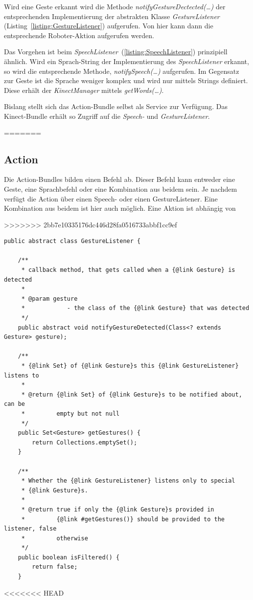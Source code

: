 Wird eine Geste erkannt wird die Methode \textit{notifyGestureDectected(\ldots)} der entsprechenden Implementierung der abstrakten Klasse
\textit{GestureListener} (Listing~\ref{listing:GestureListener}) aufgerufen. Von hier kann dann die entsprechende Roboter-Aktion aufgerufen werden.

Das Vorgehen ist beim \textit{SpeechListener}~(\ref{listing:SpeechListener}) prinzipiell \"ahnlich. Wird ein Sprach-String der Implementierung
des \textit{SpeechListener} erkannt, so wird die entsprechende Methode, \textit{notifySpeech(\ldots)} aufgerufen. Im Gegensatz zur Geste ist die
Sprache weniger komplex und wird nur mittels Strings definiert. Diese erh\"alt der \textit{KinectManager} mittels \textit{getWords(\ldots)}.

Bislang stellt sich das Action-Bundle selbst als Service zur Verf\"ugung. Das Kinect-Bundle erh\"alt so Zugriff auf die \textit{Speech-} und 
\textit{GestureListener}.


\par\smallskip
\lstset{language=Java}
=======

\subsection{Action}

Die Action-Bundles bilden einen Befehl ab. Dieser Befehl kann entweder eine Geste, eine Sprachbefehl oder eine Kombination aus beidem sein. Je nachdem verf\"ugt die Action \"uber einen Speech- oder einen GestureListener. Eine Kombination aus beidem ist hier auch m\"oglich. Eine Aktion ist abh\"angig von

\lstset{language=Java,
 basicstyle=\footnotesize, 
 numbers=left,
 captionpos=b,
 showspaces=false,             
 showstringspaces=false,}
>>>>>>> 2bb7e10335176dc446d28fa0516733abbf1cc9ef
\begin{lstlisting}[caption={Klasse GestureListener}, label={listing:GestureListener}]
public abstract class GestureListener {

	/**
	 * callback method, that gets called when a {@link Gesture} is detected
	 * 
	 * @param gesture
	 *            - the class of the {@link Gesture} that was detected
	 */
	public abstract void notifyGestureDetected(Class<? extends Gesture> gesture);

	/**
	 * {@link Set} of {@link Gesture}s this {@link GestureListener} listens to
	 * 
	 * @return {@link Set} of {@link Gesture}s to be notified about, can be
	 *         empty but not null
	 */
	public Set<Gesture> getGestures() {
		return Collections.emptySet();
	}

	/**
	 * Whether the {@link GestureListener} listens only to special
	 * {@link Gesture}s.
	 * 
	 * @return true if only the {@link Gesture}s provided in
	 *         {@link #getGestures()} should be provided to the listener, false
	 *         otherwise
	 */
	public boolean isFiltered() {
		return false;
	}
\end{lstlisting}
<<<<<<< HEAD
\par\smallskip

